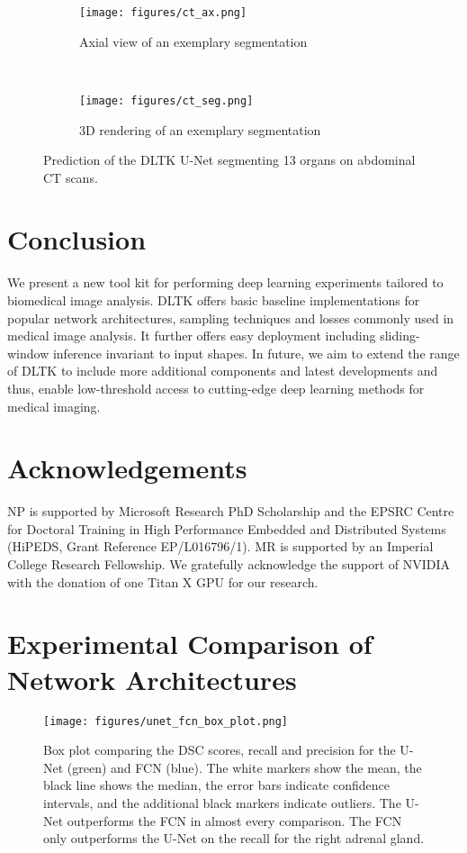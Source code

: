 \documentclass{article}
\begin{document}
\begin{figure*}[h]
\centering
\begin{subfigure}{0.45\textwidth}
	\centering
	\texttt{[image: figures/ct\_ax.png]}
    \caption{Axial view of an exemplary segmentation}
    \label{fig:ct_ax}
	\end{subfigure}%
    \,
  \begin{subfigure}{0.45\textwidth}
	\centering
	\texttt{[image: figures/ct\_seg.png]}
    \caption{3D rendering of an exemplary segmentation}
    \label{fig:ct_seg}
\end{subfigure}%
\caption{Prediction of the DLTK U-Net segmenting 13 organs on abdominal CT scans.}
\label{fig:segmentation}
\end{figure*}

\section{Conclusion}
We present a new tool kit for performing deep learning experiments tailored to biomedical image analysis. DLTK offers basic baseline implementations for popular network architectures, sampling techniques and losses commonly used in medical image analysis. It further offers easy deployment including sliding-window inference invariant to input shapes. In future, we aim to extend the range of DLTK to include more additional components and latest developments and thus, enable low-threshold access to cutting-edge deep learning methods for medical imaging. 

\section*{Acknowledgements}
NP is supported by Microsoft Research PhD Scholarship and the EPSRC Centre for Doctoral Training in High Performance Embedded and Distributed Systems (HiPEDS, Grant Reference EP/L016796/1). MR is supported by an Imperial College Research Fellowship. We gratefully acknowledge the support of NVIDIA with the donation of one Titan X GPU for our research.




\newpage
\appendix
\section{Experimental Comparison of Network Architectures}

\begin{figure*}[h]
\centering
\texttt{[image: figures/unet\_fcn\_box\_plot.png]}
\caption{Box plot comparing the DSC scores, recall and precision for the U-Net (green) and FCN (blue). The white markers show the mean, the black line shows the median, the error bars indicate confidence intervals, and the additional black markers indicate outliers. The U-Net outperforms the FCN in almost every comparison. The FCN only outperforms the U-Net on the recall for the right adrenal gland.}
\label{fig:network_box_plot}
\end{figure*}
\end{document}
